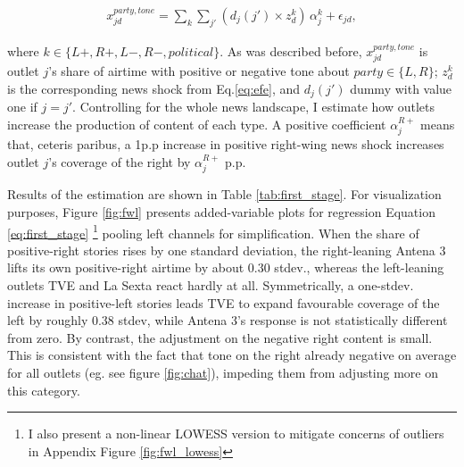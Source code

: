 \documentclass[12pt]{article}
\begin{document}

\begin{equation}\label{eq:first_stage}
	\begin{aligned}
		 x^{party, tone}_{jd} =	\sum_{k} \sum_{j'}
		\left(d_j(j') \times z^{k}_d\right)\,\alpha_{j}^{k}
		+ \epsilon_{jd},
	\end{aligned}
\end{equation}

where $k \in\{L+,R+,L-,R-, political\}$. As was described before,  $x^{party, tone}_{jd}$ is outlet $j$’s share of airtime with positive or negative tone about $party \in \{L,R\}$;  $z^{k}_d$ is the corresponding news shock from Eq.\ref{eq:efe}, and $d_j(j')$ dummy with value one if $j=j'$.  Controlling for the whole news landscape, I estimate how outlets increase the production of content of each type. 
A positive coefficient $\alpha_{j}^{R+}$ means that, ceteris paribus, a 1p.p increase in  positive right-wing news shock increases outlet $j$’s coverage of the right by $\alpha_{j}^{R+}$ p.p.

Results of the estimation are shown in Table \ref{tab:first_stage}. For visualization purposes, Figure \ref{fig:fwl} presents added-variable plots for regression Equation  \eqref{eq:first_stage} \footnote{I also present a non-linear LOWESS version to mitigate concerns of outliers in Appendix Figure \ref{fig:fwl_lowess}} pooling left channels for simplification.  When the share of  positive-right stories rises by one standard deviation, the right-leaning Antena 3 lifts its own positive-right airtime by about 0.30 stdev., whereas the left-leaning outlets TVE and La Sexta react hardly at all.  Symmetrically, a one-stdev. increase in positive-left stories leads TVE to expand favourable coverage of the left by roughly 0.38 stdev, while Antena 3’s response is not statistically different from zero.   By contrast, the adjustment on the negative right content is small. This is consistent with the fact that tone on the right already negative on average for all outlets   (eg. see figure \ref{fig:chat}), impeding them from adjusting more on this category. 
\end{document}
